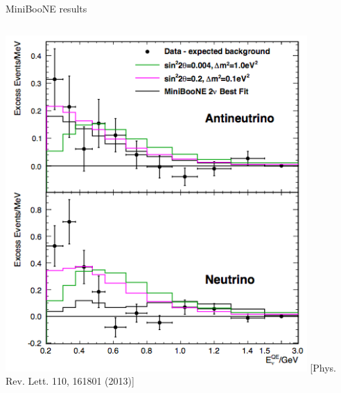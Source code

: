 \begin{frame}[t]{MiniBooNE results}

\begin{columns}[T]
  \begin{column}{0.55\textwidth}
    \includegraphics[width=0.90\textwidth]{./images/beyond3nu/accelerator/miniboone_osc_results_spectra.png}
    \vspace{0.1cm}
    {\scriptsize \color{blue}[Phys. Rev. Lett. 110, 161801 (2013)]}\\
  \end{column}
  \begin{column}{0.35\textwidth}

\end{column}
\end{columns}
\end{frame}
